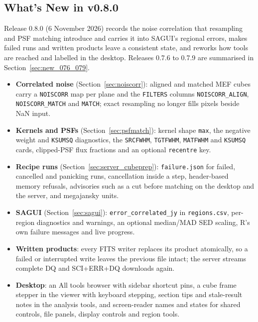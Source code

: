 \documentclass[11pt,a4paper]{article}
\newcommand{\code}[1]{\texttt{\small #1}}
\begin{document}
    \subsection{What's New in v0.8.0}
    \label{sec:new_080}

    Release 0.8.0 (6 November 2026) records the noise correlation that resampling and PSF matching introduce and carries it into SAGUI's regional errors, makes failed runs and written products leave a consistent state, and reworks how tools are reached and labelled in the desktop. Releases 0.7.6 to 0.7.9 are summarised in Section~\ref{sec:new_076_079}.

    \begin{itemize}[nosep]
    \item \textbf{Correlated noise} (Section~\ref{sec:noiscorr}): aligned and matched MEF cubes carry a \code{NOISCORR} map per plane and the \code{FILTERS} columns \code{NOISCORR\_ALIGN}, \code{NOISCORR\_MATCH} and \code{MATCH}; exact resampling no longer fills pixels beside NaN input.
    \item \textbf{Kernels and PSFs} (Section~\ref{sec:psfmatch}): kernel shape \code{max}, the negative weight and \code{KSUMSQ} diagnostics, the \code{SRCFWHM}, \code{TGTFWHM}, \code{MATFWHM} and \code{KSUMSQ} cards, clipped-PSF flux fractions and an optional \code{recentre} key.
    \item \textbf{Recipe runs} (Section~\ref{sec:server_cubeprep}): \code{failure.json} for failed, cancelled and panicking runs, cancellation inside a step, header-based memory refusals, advisories such as a cut before matching on the desktop and the server, and megajansky units.
    \item \textbf{SAGUI} (Section~\ref{sec:sagui}): \code{error\_correlated\_jy} in \code{regions.csv}, per-region diagnostics and warnings, an optional median/MAD SED scaling, R's own failure messages and live progress.
    \item \textbf{Written products}: every FITS writer replaces its product atomically, so a failed or interrupted write leaves the previous file intact; the server streams complete DQ and SCI+ERR+DQ downloads again.
    \item \textbf{Desktop}: an All tools browser with sidebar shortcut pins, a cube frame stepper in the viewer with keyboard stepping, section tips and stale-result notes in the analysis tools, and screen-reader names and states for shared controls, file panels, display controls and region tools.
    \end{itemize}
\end{document}
